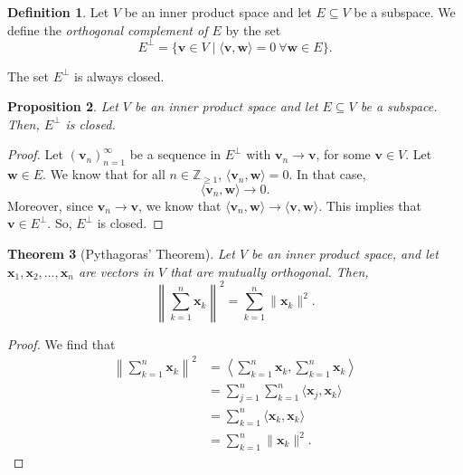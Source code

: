 \documentclass[a4paper, openany]{memoir}
\theoremstyle{definition}
\newtheorem{definition}{Definition}[section]
\theoremstyle{plain}
\newtheorem{theorem}[definition]{Theorem}
\newtheorem{proposition}[definition]{Proposition}
\begin{document}
    \begin{definition}
        Let $V$ be an inner product space and let $E \subseteq V$ be a subspace. We define the \emph{orthogonal complement of $E$} by the set
        \[E^\perp = \{\bm{v} \in V \mid \langle \bm{v}, \bm{w} \rangle = 0 \ \forall \bm{w} \in E\}.\]
    \end{definition}
    \noindent The set $E^\perp$ is always closed.
    \begin{proposition}
        Let $V$ be an inner product space and let $E \subseteq V$ be a subspace. Then, $E^\perp$ is closed.
    \end{proposition}
    \begin{proof}
        Let $(\bm{v}_n)_{n=1}^\infty$ be a sequence in $E^\perp$ with $\bm{v}_n \to \bm{v}$, for some $\bm{v} \in V$. Let $\bm{w} \in E$. We know that for all $n \in \mathbb{Z}_{\geq 1}$, $\langle \bm{v}_n, \bm{w} \rangle = 0$. In that case,
        \[\langle \bm{v}_n, \bm{w} \rangle \to 0.\]
        Moreover, since $\bm{v}_n \to \bm{v}$, we know that $\langle \bm{v}_n, \bm{w} \rangle \to \langle \bm{v}, \bm{w} \rangle$. This implies that $\bm{v} \in E^\perp$. So, $E^\perp$ is closed.
    \end{proof}

    \begin{theorem}[Pythagoras' Theorem]
        Let $V$ be an inner product space, and let $\bm{x}_1, \bm{x}_2, \dots , \bm{x}_n$ are vectors in $V$ that are mutually orthogonal. Then,
        \[\left\lVert\sum_{k=1}^n \bm{x}_k \right\rVert^2 = \sum_{k=1}^n \lVert \bm{x}_k \rVert^2.\]
    \end{theorem}
    \begin{proof}
        We find that
        \begin{align*}
            \left\lVert\sum_{k=1}^n \bm{x}_k \right\rVert^2 &= \left\langle \sum_{k=1}^n \bm{x}_k, \sum_{k=1}^n \bm{x}_k \right\rangle \\
            &= \sum_{j=1}^n \sum_{k=1}^n \langle \bm{x}_j, \bm{x}_k \rangle \\
            &= \sum_{k=1}^n \langle \bm{x}_k, \bm{x}_k \rangle \\
            &= \sum_{k=1}^n \lVert \bm{x}_k \rVert^2.
        \end{align*}
    \end{proof}
\end{document}
